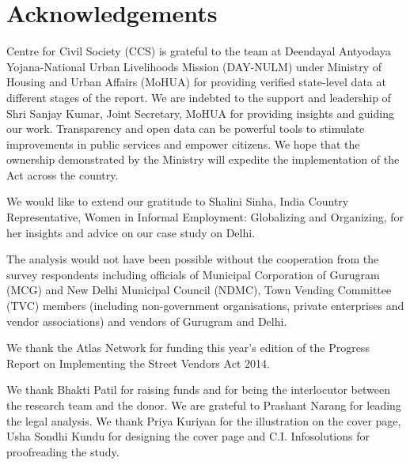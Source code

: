 \documentclass[a4paper, 12pt, twoside, table]{article}
\begin{document}


\pagestyle{empty} %
\pagestyle{fancy} %
\setcounter{page}{1} %


\section*{Acknowledgements}
Centre for Civil Society (CCS) is grateful to the team at Deendayal Antyodaya Yojana-National Urban Livelihoods Mission (DAY-NULM) under Ministry of Housing and Urban Affairs (MoHUA) for providing verified state-level data at different stages of the report. We are indebted to the support and leadership of Shri Sanjay Kumar, Joint Secretary, MoHUA for providing insights and guiding our work. Transparency and open data can be powerful tools to stimulate improvements in public services and empower citizens. We hope that the ownership demonstrated by the Ministry will expedite the implementation of the Act across the country.

We would like to extend our gratitude to Shalini Sinha, India Country Representative, Women in Informal Employment: Globalizing and Organizing, for her insights and advice on our case study on Delhi.

The analysis would not have been possible without the cooperation from the survey respondents including officials of Municipal Corporation of Gurugram (MCG) and New Delhi Municipal Council (NDMC), Town Vending Committee (TVC) members (including non-government organisations, private enterprises and vendor associations) and vendors of Gurugram and Delhi.

We thank the Atlas Network for funding this year’s edition of the Progress Report on Implementing the Street Vendors Act 2014.

We thank Bhakti Patil for raising funds and for being the interlocutor between the research team and the donor. We are grateful to Prashant Narang for leading the legal analysis. We thank Priya Kuriyan for the illustration on the cover page, Usha Sondhi Kundu for designing the cover page and C.I. Infosolutions for proofreading the study. 
\end{document}
